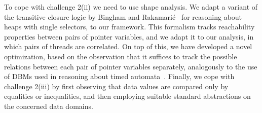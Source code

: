 To cope with challenge 2(ii) we need to use shape analysis. %
We adapt a variant of the transitive closure logic by Bingham and
Rakamari\'c~\cite{BiRa:vmcai06} for reasoning about heaps with single
selectors, to our framework. This formalism tracks reachability
properties between pairs of pointer variables, and we adapt it to our
analysis, in which pairs of threads are correlated. %
On top of this, we have developed a novel optimization, based on the
observation that it suffices to track the possible relations between
each pair of pointer variables separately, analogously to the use of
DBMs used in reasoning about timed automata~\cite{Dill:DBM}.
Finally, we cope with challenge 2(iii) by first observing that data values
are compared only by equalities or inequalities, and then employing
suitable standard abstractions on the concerned data domains.



